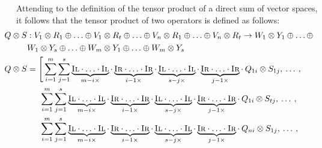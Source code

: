 Attending to the definition of the tensor product of a direct sum of vector spaces, it follows that the tensor product of two operators is defined as follows:
\begin{align*}
    \hspace{-20pt} Q \otimes S &:   V_1 \otimes R_1 \oplus \ldots \oplus V_1 \otimes R_t \oplus \ldots \oplus V_n \otimes R_1 \oplus \ldots \oplus V_n \otimes R_t \rightarrow W_1 \otimes Y_1 \oplus \ldots \oplus   \\
    \hspace{-20pt} & W_1 \otimes Y_s \oplus \ldots \oplus W_m \otimes Y_1 \oplus \ldots \oplus W_m \otimes Y_s \\
    \hspace{-20pt} Q \otimes S & =  \Bigg[ \sum_{i=1}^{m} \sum_{j=1}^{s}  \underbrace{\textsc{Il} \cdot \ldots \cdot \textsc{Il}}_{m-i \times } \cdot  \underbrace{\textsc{Ir} \cdot \ldots \cdot \textsc{Ir}}_{i-1 \times } \cdot \underbrace{\textsc{Il} \cdot \ldots \cdot \textsc{Il}}_{s-j \times } \cdot  \underbrace{\textsc{Ir} \cdot \ldots \cdot \textsc{Ir}}_{j-1 \times }\cdot  \hspace{2pt} Q_{1i} \otimes S_{1j},  \hspace{2pt} \ldots  \hspace{2pt},\\
    & \hspace{15pt}  \sum_{i=1}^{m} \sum_{j=1}^{s}  \underbrace{\textsc{Il} \cdot \ldots \cdot \textsc{Il}}_{m-i \times } \cdot  \underbrace{\textsc{Ir} \cdot \ldots \cdot \textsc{Ir}}_{i-1 \times } \cdot \underbrace{\textsc{Il} \cdot \ldots \cdot \textsc{Il}}_{s-j \times } \cdot  \underbrace{\textsc{Ir} \cdot \ldots \cdot \textsc{Ir}}_{j-1 \times }\cdot  \hspace{2pt} Q_{1i} \otimes S_{tj},  \hspace{2pt} \ldots  \hspace{2pt},\\
    & \hspace{15pt}  \sum_{i=1}^{m} \sum_{j=1}^{s}  \underbrace{\textsc{Il} \cdot \ldots \cdot \textsc{Il}}_{m-i \times } \cdot  \underbrace{\textsc{Ir} \cdot \ldots \cdot \textsc{Ir}}_{i-1 \times } \cdot \underbrace{\textsc{Il} \cdot \ldots \cdot \textsc{Il}}_{s-j \times } \cdot  \underbrace{\textsc{Ir} \cdot \ldots \cdot \textsc{Ir}}_{j-1 \times }\cdot  \hspace{2pt} Q_{ni} \otimes S_{1j},  \hspace{2pt} \ldots  \hspace{2pt},\\

\end{align*}
